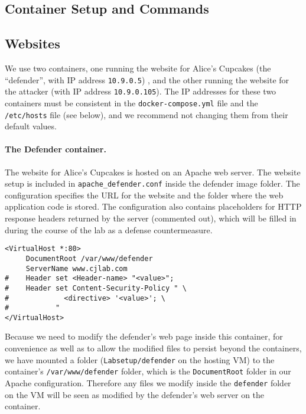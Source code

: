 \subsection{Container Setup and Commands}




\subsection{Websites}

We use two containers, one running the website for Alice's Cupcakes (the
``defender'', with IP address \texttt{10.9.0.5}) , and the other running
the website for the attacker (with IP address \texttt{10.9.0.105}).  The
IP addresses for these two containers must be consistent in the
\texttt{docker-compose.yml} file and the \texttt{/etc/hosts} file (see
below), and we recommend not changing them from their default values.

\paragraph{The Defender container.}
The website for Alice's Cupcakes is hosted on an Apache web server.  The
website setup is included in \texttt{apache\_defender.conf} inside the
defender image folder.  The configuration specifies the URL for the
website and the folder where the web application code is stored.  The
configuration also contains placeholders for HTTP response headers
returned by the server (commented out), which will be filled in during
the course of the lab as a defense countermeasure.

\begin{lstlisting}
<VirtualHost *:80>
     DocumentRoot /var/www/defender
     ServerName www.cjlab.com
#    Header set <Header-name> "<value>";
#    Header set Content-Security-Policy " \
#             <directive> '<value>'; \
#           "
</VirtualHost>
\end{lstlisting}

Because we need to modify the defender's web page inside this container,
for convenience as well as to allow the modified files to persist beyond
the containers, we have mounted a folder (\texttt{Labsetup/defender} on
the hosting VM) to the container's \texttt{/var/www/defender} folder,
which is the \texttt{DocumentRoot} folder in our Apache configuration.
Therefore any files we modify inside the \texttt{defender} folder on the
VM will be seen as modified by the defender's web server on the
container. 

